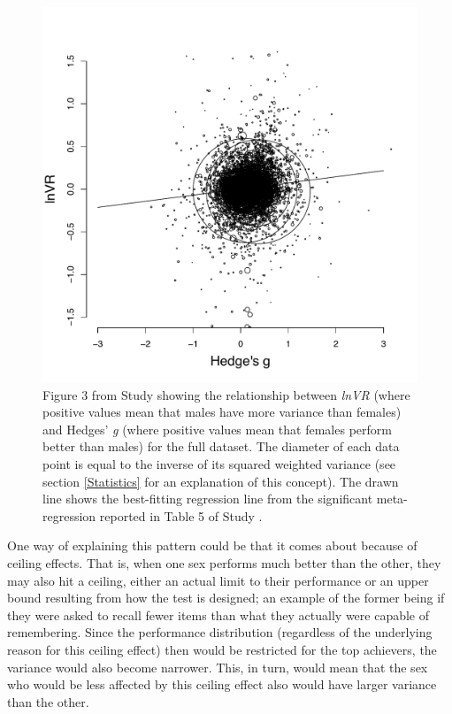 \begin{figure} \centering \includegraphics[width=120mm]{./Figures/Study2_lnVR_g_relationship.pdf} \caption{Figure 3 from Study  showing the relationship between \emph{lnVR} (where positive values mean that males have more variance than females) and Hedges' \emph{g} (where positive values mean that females perform better than males) for the full dataset. The diameter of each data point is equal to the inverse of its squared weighted variance (see section \ref{Statistics} for an explanation of this concept). The drawn line shows the best-fitting regression line from the significant meta-regression reported in Table 5 of Study .} \label{Figure:Study2_lnVR_g_relationship} \end{figure}

One way of explaining this pattern could be that it comes about because of ceiling effects. That is, when one sex performs much better than the other, they may also hit a ceiling, either an actual limit to their performance or an upper bound resulting from how the test is designed; an example of the former being if they were asked to recall fewer items than what they actually were capable of remembering. Since the performance distribution (regardless of the underlying reason for this ceiling effect) then would be restricted for the top achievers, the variance would also become narrower. This, in turn, would mean that the sex who would be less affected by this ceiling effect also would have larger variance than the other.

